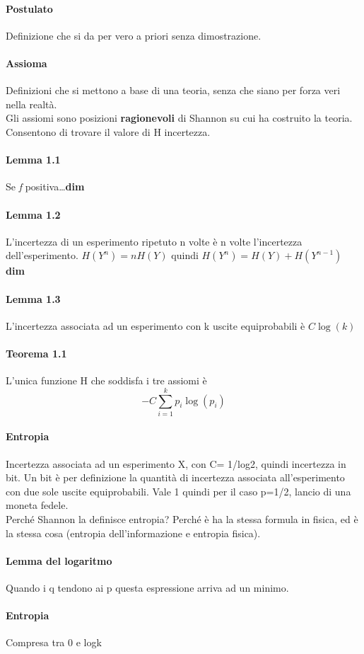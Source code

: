 \documentclass[10pt]{book}
\begin{document}
\paragraph{Postulato} Definizione che si da per vero a priori senza dimostrazione.
\paragraph{Assioma} Definizioni che si mettono a base di una teoria, senza che siano per forza veri nella realtà.\\
Gli assiomi sono posizioni \textbf{ragionevoli} di Shannon su cui ha costruito la teoria. Consentono di trovare il valore di H incertezza.
\paragraph{Lemma 1.1} Se \textit{f} positiva\ldots\textbf{dim}
\paragraph{Lemma 1.2} L'incertezza di un esperimento ripetuto n volte è n volte l'incertezza dell'esperimento. $H(Y^n) = nH(Y)$ quindi $H(Y^n) = H(Y) + H(Y^{n-1})$ \textbf{dim}
\paragraph{Lemma 1.3} L'incertezza associata ad un esperimento con k uscite equiprobabili è $C\log(k)$
\paragraph{Teorema 1.1} L'unica funzione H che soddisfa i tre assiomi è $$-C \sum_{i=1}^k p_i \log(p_i)$$
\paragraph{Entropia} Incertezza associata ad un esperimento X, con C= 1/log2, quindi incertezza in bit. Un bit è per definizione la quantità di incertezza associata all'esperimento con due sole uscite equiprobabili. Vale 1 quindi per il caso p=1/2, lancio di una moneta fedele.\\
Perché Shannon la definisce entropia? Perché è ha la stessa formula in fisica, ed è la stessa cosa (entropia dell'informazione e entropia fisica).
\paragraph{Lemma del logaritmo} Quando i q tendono ai p questa espressione arriva ad un minimo.
\paragraph{Entropia} Compresa tra 0 e logk
\end{document}
